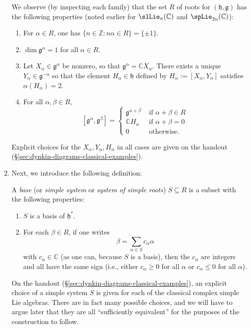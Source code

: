 \documentclass[reqno]{amsart} 
\begin{document}
\begin{enumerate}
  We observe (by inspecting each family) that the set $R$ of roots for $(\mathfrak{h},\mathfrak{g})$ has the following properties (noted earlier for $\slLie_n(\mathbb{C})$ and $\spLie_{2n}(\mathbb{C})$):
  \begin{enumerate}
  \item For $\alpha \in R$, one has $\{n \in \mathbb{Z} : n \alpha \in R\} = \{\pm 1\}$.
  \item $\dim \mathfrak{g}^\alpha = 1$ for all $\alpha \in R$.
  \item Let $X_\alpha \in \mathfrak{g}^\alpha$ be nonzero, so that $\mathfrak{g}^\alpha = \mathbb{C} X_\alpha$.  There exists a unique $Y_\alpha \in \mathfrak{g}^{-\alpha}$ so that the element $H_\alpha \in \mathfrak{h}$ defined by $H_\alpha := [X_\alpha,Y_\alpha]$ satisfies $\alpha(H_\alpha) = 2$.
  \item For all $\alpha,\beta \in R$,
    \begin{equation*}
      {} [\mathfrak{g}^\alpha, \mathfrak{g}^\beta]
      = 
\begin{cases}
        \mathfrak{g}^{\alpha + \beta} & \text{ if } \alpha + \beta \in R \\
        \mathbb{C} H_\alpha  & \text{ if } \alpha + \beta = 0 \\
        0 & \text{ otherwise.}
      \end{cases}
    \end{equation*}
  \end{enumerate}
  Explicit choices for the $X_\alpha, Y_\alpha, H_\alpha$ in all cases are given on the handout (\S\ref{sec:dynkin-diagrams-classical-examples}).

\item Next, we introduce the following definition:
  \begin{definition}
    A \emph{base} (or \emph{simple system} or \emph{system of simple roots}) $S \subseteq R$ is a subset with the following properties:
    \begin{enumerate}
    \item $S$ is a basis of $\mathfrak{h}^*$.
    \item For each $\beta \in R$, if one writes
      \begin{equation}\label{eq:decomp-in-terms-of-simple-roots}
        \beta = \sum_{\alpha \in S} c_\alpha \alpha
      \end{equation}
      with $c_\alpha \in \mathbb{C}$ (as one can, because $S$ is a basis), then the $c_\alpha$ are integers and all have the same sign (i.e., either $c_\alpha \geq 0$ for all $\alpha$ or $c_\alpha \leq 0$ for all $\alpha$).
    \end{enumerate}
  \end{definition}
  On the handout (\S\ref{sec:dynkin-diagrams-classical-examples}), an explicit choice of a simple system $S$ is given for each of the classical complex simple Lie algebras.  There are in fact many possible choices, and we will have to argue later that they are all ``sufficiently equivalent'' for the purposes of the construction to follow.


\end{enumerate}
\end{document}
